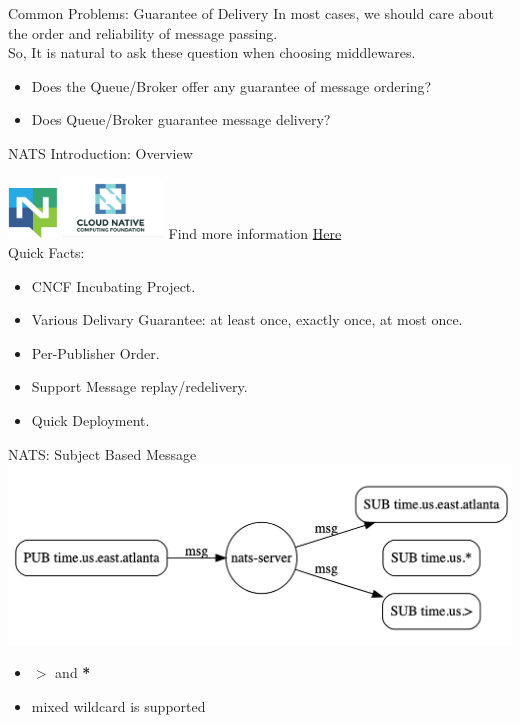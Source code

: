 \documentclass{beamer}
\begin{document}
\begin{frame}{Common Problems:  Guarantee of Delivery}
    In most cases, we should care about the order and reliability of message passing.
    \\
    So, It is natural to ask these question when choosing middlewares.
    \begin{itemize}
        \item Does the Queue/Broker offer any guarantee of message ordering?
        \item Does Queue/Broker guarantee message delivery?
    \end{itemize}
\end{frame}

\begin{frame}{NATS Introduction: Overview}

    \includegraphics[width=0.1\textwidth]{assets/NATSLogo.png}
    \includegraphics[width=0.2\textwidth]{assets/CNCF.jpeg}
    Find more information \href{https://docs.nats.io}{Here}
    \\
    Quick Facts:
    \begin{itemize}
        \item CNCF Incubating Project.
        \item Various Delivary Guarantee: at least once, exactly once, at most once.
        \item Per-Publisher Order.
        \item Support Message replay/redelivery.
        \item Quick Deployment.
    \end{itemize}
\end{frame}

\begin{frame}{NATS: Subject Based Message}
    \includegraphics[width=\textwidth]{assets/Subject.png}
    \begin{itemize}
        \item $>$ and \textbf{*}
        \item mixed wildcard is supported
    \end{itemize}
\end{frame}
\end{document}
